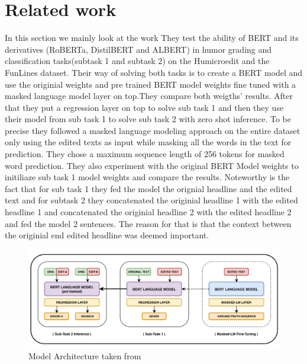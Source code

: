 \documentclass[11pt,a4paper,onecolumn,oneside,notitlepage]{article}
\begin{document}
	\section{Related work}
		In this section we mainly look at the work \textcite{Bert1}
		They test the ability of BERT and its derivatives (RoBERTa, DistilBERT and ALBERT) in humor grading and classification tasks(subtask 1 and subtask 2) on the Humicroedit and the FunLines dataset.
		Their way of solving both tasks is to create a  BERT model and use the originial weights and  pre trained BERT model weights  fine tuned  with a masked language model layer on top.They compare both weigths' results. After that they put a regression layer on top to solve sub task 1 and then they use their model from sub task 1 to solve sub task 2 with zero shot inference. 
		To be precise they followed a masked language modeling approach on the entire dataset only using the edited texts as input while masking all the words in the text for prediction. They chose a maximum sequence length of 256 tokens for masked word prediction. They also experiment with the original BERT Model weights to initiliaze sub task 1 model weights and compare the results.
		Noteworthy is the fact that for sub  task 1 they fed the model the orignial headline and the edited text and for subtask 2 they concatenated the originial headline 1 with the edited headline 1 and concatenated the originial headline 2 with the edited headline 2 and fed the model 2 sentences.
		The reason for that is that the context between the originial end edited headline was deemed important.
		  \begin{figure}
			\begin{center}
				\includegraphics[width=1.0\linewidth]{system_architecture.png}
			\end{center}
			
			\caption{Model Architecture taken from \textcite{Bert1} }\label{fig1}
		\end{figure}	
\end{document}
